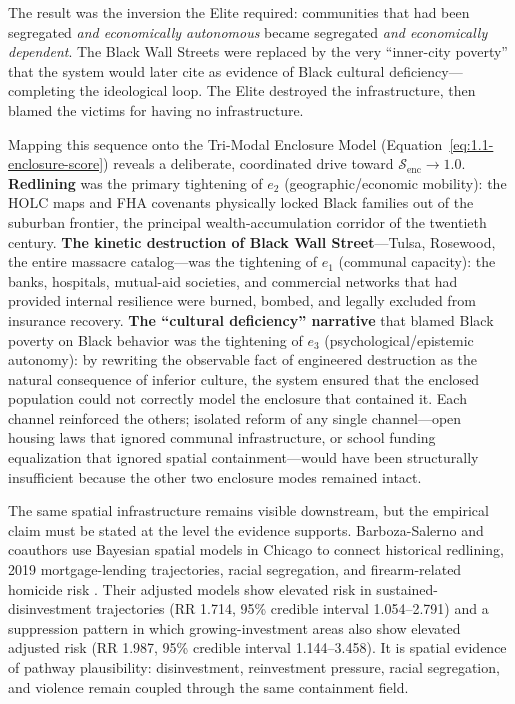 The result was the inversion the Elite required: communities that had been segregated \textit{and economically autonomous} became segregated \textit{and economically dependent}. The Black Wall Streets were replaced by the very ``inner-city poverty'' that the system would later cite as evidence of Black cultural deficiency---completing the ideological loop. The Elite destroyed the infrastructure, then blamed the victims for having no infrastructure.

Mapping this sequence onto the Tri-Modal Enclosure Model (Equation~\ref{eq:1.1-enclosure-score}) reveals a deliberate, coordinated drive toward \(\mathcal{S}_{\text{enc}} \to 1.0\). \textbf{Redlining} was the primary tightening of \(e_2\) (geographic/economic mobility): the HOLC maps and FHA covenants physically locked Black families out of the suburban frontier, the principal wealth-accumulation corridor of the twentieth century. \textbf{The kinetic destruction of Black Wall Street}---Tulsa, Rosewood, the entire massacre catalog---was the tightening of \(e_1\) (communal capacity): the banks, hospitals, mutual-aid societies, and commercial networks that had provided internal resilience were burned, bombed, and legally excluded from insurance recovery. \textbf{The ``cultural deficiency'' narrative} that blamed Black poverty on Black behavior was the tightening of \(e_3\) (psychological/epistemic autonomy): by rewriting the observable fact of engineered destruction as the natural consequence of inferior culture, the system ensured that the enclosed population could not correctly model the enclosure that contained it. Each channel reinforced the others; isolated reform of any single channel---open housing laws that ignored communal infrastructure, or school funding equalization that ignored spatial containment---would have been structurally insufficient because the other two enclosure modes remained intact.

The same spatial infrastructure remains visible downstream, but the empirical claim must be stated at the level the evidence supports. Barboza-Salerno and coauthors use Bayesian spatial models in Chicago to connect historical redlining, 2019 mortgage-lending trajectories, racial segregation, and firearm-related homicide risk \cite{barboza_salerno_redlining_firearm_2025}. Their adjusted models show elevated risk in sustained-disinvestment trajectories (RR 1.714, 95\% credible interval 1.054--2.791) and a suppression pattern in which growing-investment areas also show elevated adjusted risk (RR 1.987, 95\% credible interval 1.144--3.458). It is spatial evidence of pathway plausibility: disinvestment, reinvestment pressure, racial segregation, and violence remain coupled through the same containment field.

